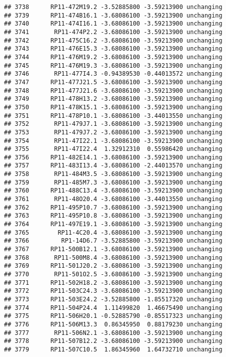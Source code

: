 \documentclass[]{article}
\begin{document}
\begin{verbatim}
## 3738      RP11-472M19.2 -3.52885800 -3.59213900 unchanging
## 3739      RP11-474B16.1 -3.68086100 -3.59213900 unchanging
## 3740      RP11-474I16.1 -3.68086100 -3.59213900 unchanging
## 3741       RP11-474P2.2 -3.68086100 -3.59213900 unchanging
## 3742      RP11-475C16.2 -3.68086100 -3.59213900 unchanging
## 3743      RP11-476E15.3 -3.68086100 -3.59213900 unchanging
## 3744      RP11-476M19.2 -3.68086100 -3.59213900 unchanging
## 3745      RP11-476M19.3 -3.68086100 -3.59213900 unchanging
## 3746       RP11-477I4.3 -0.94389530 -0.44013572 unchanging
## 3747      RP11-477J21.5 -3.68086100 -3.59213900 unchanging
## 3748      RP11-477J21.6 -3.68086100 -3.59213900 unchanging
## 3749      RP11-478H13.2 -3.68086100 -3.59213900 unchanging
## 3750      RP11-478K15.1 -3.68086100 -3.59213900 unchanging
## 3751      RP11-478P10.1 -3.68086100 -3.44013550 unchanging
## 3752       RP11-479J7.1 -3.68086100 -3.59213900 unchanging
## 3753       RP11-479J7.2 -3.68086100 -3.59213900 unchanging
## 3754       RP11-47I22.1 -3.68086100 -3.59213900 unchanging
## 3755       RP11-47I22.4  1.32912310  0.55986420 unchanging
## 3756      RP11-482E14.1 -3.68086100 -3.59213900 unchanging
## 3757      RP11-483I13.4 -3.68086100 -2.44013570 unchanging
## 3758       RP11-484M3.5 -3.68086100 -3.59213900 unchanging
## 3759       RP11-485M7.3 -3.68086100 -3.59213900 unchanging
## 3760      RP11-488C13.4 -3.68086100 -3.59213900 unchanging
## 3761       RP11-48O20.4 -3.68086100 -3.44013550 unchanging
## 3762      RP11-495P10.7 -3.68086100 -3.59213900 unchanging
## 3763      RP11-495P10.8 -3.68086100 -3.59213900 unchanging
## 3764      RP11-497E19.1 -3.68086100 -3.59213900 unchanging
## 3765        RP11-4C20.4 -3.68086100 -3.59213900 unchanging
## 3766         RP1-14D6.7 -3.52885800 -3.59213900 unchanging
## 3767      RP11-500B12.1 -3.68086100 -3.59213900 unchanging
## 3768       RP11-500M8.4 -3.68086100 -3.59213900 unchanging
## 3769      RP11-501J20.2 -3.68086100 -3.59213900 unchanging
## 3770       RP11-501O2.5 -3.68086100 -3.59213900 unchanging
## 3771      RP11-502H18.2 -3.68086100 -3.59213900 unchanging
## 3772      RP11-503C24.3 -3.68086100 -3.59213900 unchanging
## 3773      RP11-503E24.2 -3.52885800 -1.85517320 unchanging
## 3774      RP11-504P24.4  1.11499820  1.46675490 unchanging
## 3775      RP11-506H20.1 -0.52885790 -0.85517323 unchanging
## 3776      RP11-506M13.3  0.86345950  0.88179230 unchanging
## 3777       RP11-506N2.1 -3.68086100 -3.59213900 unchanging
## 3778      RP11-507B12.2 -3.68086100 -3.59213900 unchanging
## 3779      RP11-507C10.5  1.86345960  1.64732710 unchanging

\end{verbatim}
\end{document}
